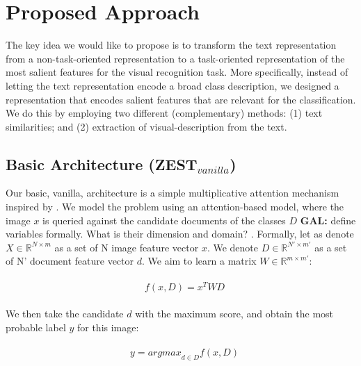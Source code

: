 \documentclass[11pt,a4paper]{article}
\newcommand\gal[1]{\textcolor{bright}{\textbf{GAL:} #1 }}
\begin{document}
\section{Proposed Approach}
\label{task}

The key idea we would like to propose is to transform the text representation from a non-task-oriented representation to a task-oriented representation of the most salient features for the visual recognition task. More specifically, instead of letting the text representation encode a broad class description, we designed a representation that encodes salient features that are relevant for the classification. We do this by employing two different (complementary) methods: (1) text similarities; and (2) extraction of visual-description from the text.


\subsection{Basic Architecture (ZEST$_{vanilla}$)}
\label{section_ZEST_C}


Our basic, vanilla, architecture is a simple multiplicative attention mechanism \cite{luong2015effective} inspired by \citet{romera2015embarrassingly}. We model the problem using an attention-based model, where the image $x$ is queried
against the candidate documents of the classes $D$ \gal{define variables formally. 
What is their dimension and domain?}.
Formally, let as denote $X\in \mathbb{R}^{N\times m}$ as a set of N image feature vector $x$.
We denote $D\in \mathbb{R}^{N'\times m'}$ as a set of N' document feature vector $d$.
We aim to learn a matrix \(W\in  \mathbb{R}^{m\times m'}\):
 
\begin{equation}
\label{equation:attention}
\begin{aligned}
\begin{split}
&f(x,D)=x^TWD
\end{split}

\end{aligned}
\end{equation}

 We then take the candidate $d$ with the maximum score, and obtain the most probable label  $y$ for this image:

\begin{equation}
\label{equation:attention}
\begin{aligned}
\begin{split}
&y={argmax}_{d\in D}f(x,D)
\end{split}

\end{aligned}
\end{equation}
\end{document}

